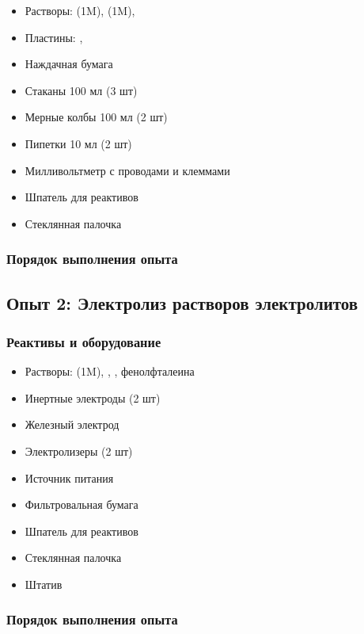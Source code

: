 \documentclass[a4paper, 12pt]{article}
\begin{document}
\begin{itemize}
	\item Растворы:  (1M),  (1M), 
	\item Пластины: , 
	
	\item Наждачная бумага
	\item Стаканы 100 мл (3 шт)
	\item Мерные колбы 100 мл (2 шт)
	\item Пипетки 10 мл (2 шт)
	\item Милливольтметр с проводами и клеммами
	\item Шпатель для реактивов
	\item Стеклянная палочка
\end{itemize}

\subsubsection{Порядок выполнения опыта}

\subsection{Опыт 2: Электролиз растворов электролитов}

\subsubsection{Реактивы и оборудование}

\begin{itemize}
	\item Растворы:  (1M), , , фенолфталеина
	
	\item Инертные электроды (2 шт)
	\item Железный электрод
	\item Электролизеры (2 шт)
	\item Источник питания
	\item Фильтровальная бумага
	\item Шпатель для реактивов
	\item Стеклянная палочка
	\item Штатив
\end{itemize}

\subsubsection{Порядок выполнения опыта}
\end{document}
